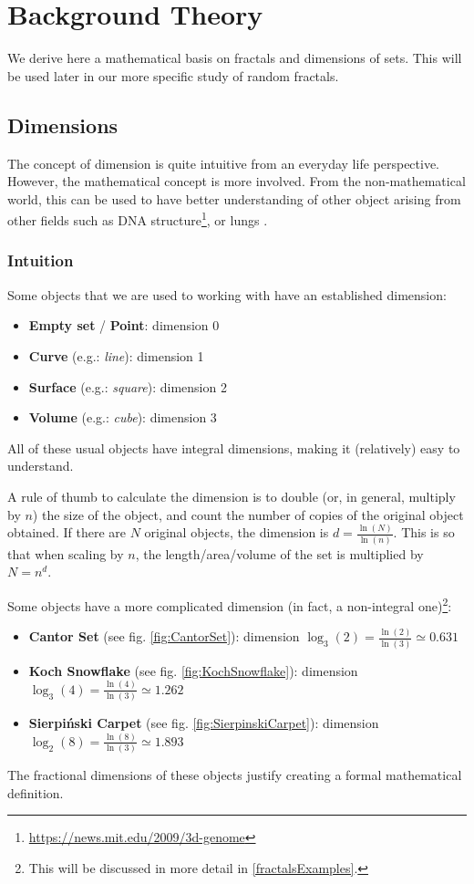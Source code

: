 \section{Background Theory}
We derive here a mathematical basis on fractals and dimensions of sets.
This will be used later in our more specific study of random fractals.

\subsection{Dimensions}
The concept of dimension is quite intuitive from an everyday life perspective.
However, the mathematical concept is more involved.
From the non-mathematical world, this can be used to have better understanding of other object arising from other fields such as DNA structure\footnote{\url{https://news.mit.edu/2009/3d-genome}}, or lungs \cite{IOLMSD_2009}.

\subsubsection{Intuition}
Some objects that we are used to working with have an established dimension:
\begin{itemize}
	\item \textbf{Empty set} / \textbf{Point}: dimension 0
	\item \textbf{Curve} (e.g.: \textit{line}): dimension 1
	\item \textbf{Surface} (e.g.: \textit{square}): dimension 2
	\item \textbf{Volume} (e.g.: \textit{cube}): dimension 3
\end{itemize}
All of these usual objects have integral dimensions, making it (relatively) easy to understand.

A rule of thumb to calculate the dimension is to double (or, in general, multiply by $n$) the size of the object, and count the number of copies of the original object obtained.
If there are $N$ original objects, the dimension is $d = \frac{\ln(N)}{\ln(n)}$.
This is so that when scaling by $n$, the length/area/volume of the set is multiplied by $N = n^d$.

Some objects have a more complicated dimension (in fact, a non-integral one)\footnote{This will be discussed in more detail in \ref{fractalsExamples}.}:
\begin{itemize}
	\item \textbf{Cantor Set} (see fig. \ref{fig:CantorSet}): dimension $\log_3(2) = \frac{\ln(2)}{\ln(3)} \simeq 0.631$
	\item \textbf{Koch Snowflake} (see fig. \ref{fig:KochSnowflake}): dimension $\log_3(4) = \frac{\ln(4)}{\ln(3)} \simeq 1.262$
	\item \textbf{Sierpiński Carpet} (see fig. \ref{fig:SierpinskiCarpet}): dimension $\log_2(8) = \frac{\ln(8)}{\ln(3)} \simeq 1.893$
\end{itemize}
The fractional dimensions of these objects justify creating a formal mathematical definition.

